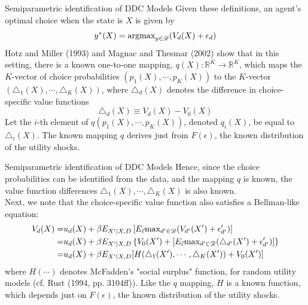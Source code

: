 \documentclass[aspectratio=169,11pt]{beamer}
\begin{document}
\begin{frame}{Semiparametric identification of DDC Models}
Given these definitions, an agent's optimal choice when the state is $X$ is given by 
\begin{equation*}
y^* (X) = \text{argmax}_{y \in \mathscr{D}} (V_d(X) + \epsilon_d)
\end{equation*}
Hotz and Miller (1993) and Magnac and Thesmar (2002) show that in this setting, there is a known one-to-one mapping, $q(X) : \mathbb{R}^K \rightarrow \mathbb{R}^K$, which maps the $K$-vector of choice probabilities $(p_1(X), \cdots , p_K(X))$ to the $K$-vector $(\triangle_1(X), \cdots , \triangle_K (X))$, where $\triangle_d(X)$ denotes the difference in choice-specific value functions
\begin{equation*}
\triangle_d(X) \equiv V_d(X) - V_0(X)
\end{equation*}
Let the $i$-th element of $q(p_1(X), \cdots, p_K(X))$, denoted $q_i(X)$, be equal to $\triangle_i(X)$. The known mapping $q$ derives just from $F(\epsilon)$, the known distribution of the utility shocks. \\
\end{frame}

\begin{frame}{Semiparametric identification of DDC Models}
Hence, since the choice probabilities can be identified from the data, and the mapping $q$ is known, the value function differences $\triangle_1(X), \cdots, \triangle_K(X)$ is also known. \\
\vspace{2mm}
Next, we note that the choice-specific value function also satisfies a Bellman-like equation:
\begin{equation}
\begin{split}
V_d(X) = & u_d(X) + \beta E_{X'|X,D} \left [ E_{\vec{\epsilon}} \text{max}_{d' \in \mathscr{D}} (V_{d'} (X') + \epsilon'_{d'}) \right ] \\
= & u_d(X) + \beta E_{X'|X,D} \left \{ V_0 (X') + \left [ E_{\vec{\epsilon}} \text{max}_{d' \in \mathscr{D}} (\triangle_{d'} (X') + \epsilon'_{d'}) \right ] \right \} \\
= & u_d(X) + \beta E_{X'|X,D} [ H(\triangle_1 (X'), \cdots, \triangle_K(X')) + V_0(X') ]
\end{split}
\end{equation}
where $H(\cdots)$ denotes McFadden's "social surplus" function, for random utility models (cf. Rust (1994, pp. 3104ff)). Like the $q$ mapping, $H$ is a known function, which depends just on $F(\epsilon)$, the known distribution of the utility shocks. 
\end{frame}
\end{document}
